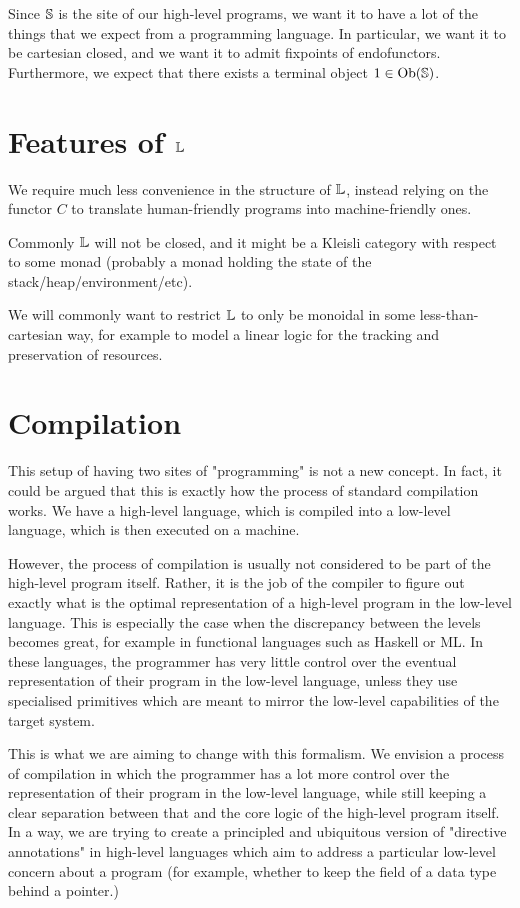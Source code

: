 Since $\S$ is the site of our high-level programs, we want it to have a lot of
the things that we expect from a programming language. In particular, we want
it to be cartesian closed, and we want it to admit fixpoints of endofunctors.
Furthermore, we expect that there exists a terminal object $1 \in \Ob(\S)$.

\section{Features of $\L$}

We require much less convenience in the structure of $\L$, instead relying on
the functor $C$ to translate human-friendly programs into machine-friendly
ones.

Commonly $\L$ will not be closed, and it might be a Kleisli category with
respect to some monad (probably a monad holding the state of the
stack/heap/environment/etc).

We will commonly want to restrict $\L$ to only be monoidal in some
less-than-cartesian way, for example to model a linear logic for the tracking
and preservation of resources.

\section{Compilation}

This setup of having two sites of "programming" is not a new concept. In fact,
it could be argued that this is exactly how the process of standard compilation
works. We have a high-level language, which is compiled into a low-level
language, which is then executed on a machine.

However, the process of compilation is usually not considered to be part of the
high-level program itself. Rather, it is the job of the compiler to figure out
exactly what is the optimal representation of a high-level program in the
low-level language. This is especially the case when the discrepancy between
the levels becomes great, for example in functional languages such as Haskell
or ML. In these languages, the programmer has very little control over the
eventual representation of their program in the low-level language, unless they
use specialised primitives which are meant to mirror the low-level capabilities
of the target system.

This is what we are aiming to change with this formalism. We envision a process
of compilation in which the programmer has a lot more control over the
representation of their program in the low-level language, while still keeping
a clear separation between that and the core logic of the high-level program
itself. In a way, we are trying to create a principled and ubiquitous version
of "directive annotations" in high-level languages which aim to address a
particular low-level concern about a program (for example, whether to keep the
field of a data type behind a pointer.)

